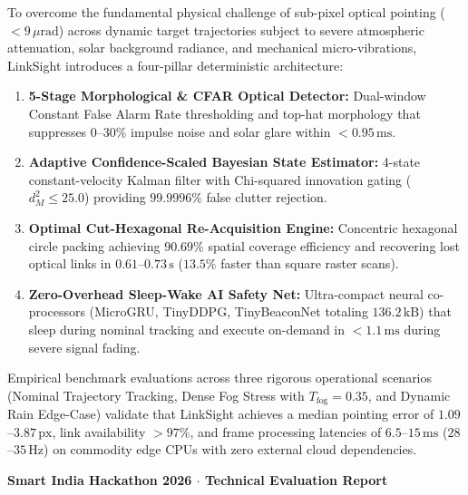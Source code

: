 \documentclass[11pt,a4paper]{article}
\begin{document}
\begin{titlepage}
\begin{tcolorbox}[
    colback=lightgraybg,
    colframe=isroblue,
    width=\linewidth,
    arc=1.2mm,
    boxrule=0.9pt,
    top=7pt,bottom=7pt,left=12pt,right=12pt
  ]
    To overcome the fundamental physical challenge of sub-pixel optical pointing ($< 9\,\mu\text{rad}$) across dynamic target trajectories subject to severe atmospheric attenuation, solar background radiance, and mechanical micro-vibrations, LinkSight introduces a four-pillar deterministic architecture:
    \begin{enumerate}[noitemsep,topsep=1pt,leftmargin=1.4em]
      \item \textbf{5-Stage Morphological \& CFAR Optical Detector:} Dual-window Constant False Alarm Rate thresholding and top-hat morphology that suppresses 0--30\% impulse noise and solar glare within $< 0.95\,\text{ms}$.
      \item \textbf{Adaptive Confidence-Scaled Bayesian State Estimator:} 4-state constant-velocity Kalman filter with Chi-squared innovation gating ($d_M^2 \le 25.0$) providing $99.9996\%$ false clutter rejection.
      \item \textbf{Optimal Cut-Hexagonal Re-Acquisition Engine:} Concentric hexagonal circle packing achieving $90.69\%$ spatial coverage efficiency and recovering lost optical links in $0.61$--$0.73\,\text{s}$ ($13.5\%$ faster than square raster scans).
      \item \textbf{Zero-Overhead Sleep-Wake AI Safety Net:} Ultra-compact neural co-processors (MicroGRU, TinyDDPG, TinyBeaconNet totaling $136.2\,\text{kB}$) that sleep during nominal tracking and execute on-demand in $< 1.1\,\text{ms}$ during severe signal fading.
    \end{enumerate}
    \vspace{0.12cm}
    
    Empirical benchmark evaluations across three rigorous operational scenarios (Nominal Trajectory Tracking, Dense Fog Stress with $T_{\text{fog}}=0.35$, and Dynamic Rain Edge-Case) validate that LinkSight achieves a median pointing error of $1.09$--$3.87\,\text{px}$, link availability $> 97\%$, and frame processing latencies of $6.5$--$15\,\text{ms}$ ($28$--$35\,\text{Hz}$) on commodity edge CPUs with zero external cloud dependencies.
  \end{tcolorbox}
  
  \vspace{0.3cm}
  
  \begin{center}
    \footnotesize\textcolor{darkslate}{\textbf{Smart India Hackathon 2026 $\cdot$ Technical Evaluation Report}}
  \end{center}
\end{titlepage}
\end{document}

